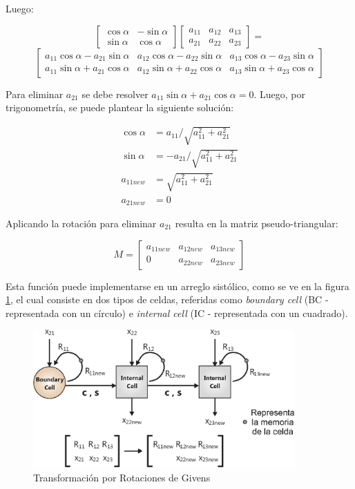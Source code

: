 Luego:

\[
	\left[
		\begin{array}{cc}
			 \cos\alpha & -\sin\alpha\\
			 \sin\alpha & \cos\alpha
		\end{array}
	\right]
	\left[
		\begin{array}{ccc}
			a_{11} & a_{12} & a_{13} \\
			a_{21} & a_{22} & a_{23}
		\end{array}
	\right]
	= 
\]
\[
	\left[
		\begin{array}{ccc}
			 a_{11}\cos\alpha-a_{21}\sin\alpha &
			 a_{12}\cos\alpha-a_{22}\sin\alpha &
			 a_{13}\cos\alpha-a_{23}\sin\alpha \\
			 a_{11}\sin\alpha+a_{21}\cos\alpha &
			 a_{12}\sin\alpha+a_{22}\cos\alpha &
			 a_{13}\sin\alpha+a_{23}\cos\alpha
		\end{array}
	\right]
\]

Para eliminar $a_{21}$ se debe resolver $a_{11}\sin\alpha+a_{21}\cos\alpha = 0$. Luego, por trigonometría, se puede plantear la siguiente solución:

\begin{align}
\cos\alpha &=  a_{11} / \sqrt{a_{11}^2 + a_{21}^2}\\
\sin\alpha &= -a_{21} / \sqrt{a_{11}^2 + a_{21}^2}\\
 a_{11new} &= \sqrt{a_{11}^2 + a_{21}^2}\\
 a_{21new} &= 0
\end{align}

Aplicando la rotación para eliminar $a_{21}$ resulta en la matriz pseudo-triangular:

\[
M=
	\left[
		\begin{array}{ccc}
			a_{11new} & a_{12new} & a_{13new} \\
			    0     & a_{22new} & a_{23new}
		\end{array}
	\right]
\]

Esta función puede implementarse en un arreglo sistólico, como se ve en la figura \ref{fig:rls_givens_rotations}, el cual consiste en dos tipos de celdas, referidas como \textit{boundary cell} (BC - representada con un círculo) e \textit{internal cell} (IC - representada con un cuadrado).

\begin{figure}[h!]
        \centering
        \includegraphics[width=10cm]{./figures/C03-rls_givens_rotations}
        \caption{Transformación por Rotaciones de Givens}
        \label{fig:rls_givens_rotations}
\end{figure}

